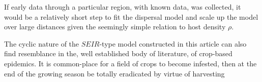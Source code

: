 If early data through a particular region, with known data, was collected, it would be a relatively short step to fit the dispersal model and scale up the model over large distances given the seemingly simple relation to host density $\rho$.



The cyclic nature of the $SEIR$-type model constructed in this article can also find resemblance in the, well established body of literature, of crop-based epidemics. It is common-place for a field of crops to become infested, then at the end of the growing season be totally eradicated by virtue of harvesting 




